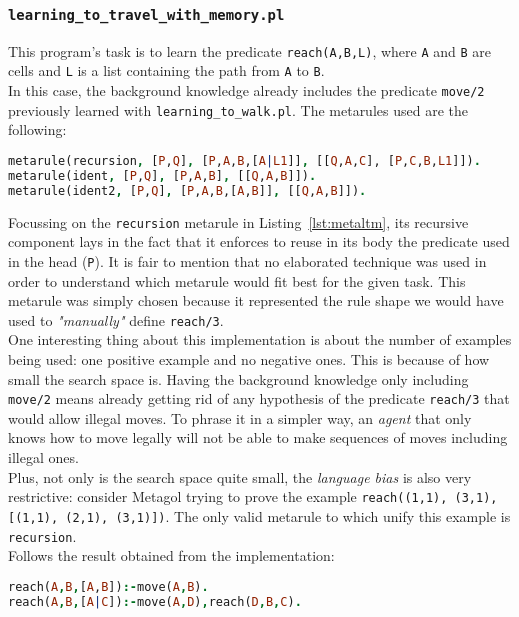 \subsubsection{\texttt{learning\_to\_travel\_with\_memory.pl}}\label{sec:lttm}
This program's task is to learn the predicate \texttt{reach(A,B,L)}, where \texttt{A} and \texttt{B} are cells and
\texttt{L} is a list containing the path from \texttt{A} to \texttt{B}.\\
In this case, the background knowledge already includes the predicate \texttt{move/2} previously learned with \texttt{learning\_to\_walk.pl}.
The metarules used are the following:
\begin{lstlisting}[label={lst:metaltm}, language=Prolog, caption=Metarules in \texttt{learning\_to\_travel\_with\_memory.pl}, belowcaptionskip=1cm]
metarule(recursion, [P,Q], [P,A,B,[A|L1]], [[Q,A,C], [P,C,B,L1]]).
metarule(ident, [P,Q], [P,A,B], [[Q,A,B]]).
metarule(ident2, [P,Q], [P,A,B,[A,B]], [[Q,A,B]]).
\end{lstlisting}
Focussing on the \texttt{recursion} metarule in Listing~\ref{lst:metaltm}, its recursive component lays in the fact that it enforces to reuse in its body the predicate used
in the head (\texttt{P}). It is fair to mention that no elaborated technique was used in order to understand which metarule would fit best for the given task. This metarule
was simply chosen because it represented the rule shape we would have used to \emph{"manually"} define \texttt{reach/3}.\\

One interesting thing about this implementation is about the number of examples being used: one positive example and no negative ones. This is because of how small
the search space is. Having the background knowledge only including \texttt{move/2} means already getting rid of any hypothesis of the predicate \texttt{reach/3} that
would allow illegal moves. To phrase it in a simpler way, an \emph{agent} that only knows how to move legally will not be able to make sequences of moves including
illegal ones.\\
Plus, not only is the search space quite small, the \emph{language bias} is also very restrictive: consider Metagol trying to prove the example \texttt{reach((1,1), (3,1), [(1,1), (2,1), (3,1)])}.
The only valid metarule to which unify this example is \texttt{recursion}.\\
Follows the result obtained from the implementation:
\begin{lstlisting}[language=Prolog, caption=Result of \texttt{learning\_to\_travel\_with\_memory.pl}, belowcaptionskip=1cm]
reach(A,B,[A,B]):-move(A,B).
reach(A,B,[A|C]):-move(A,D),reach(D,B,C).
\end{lstlisting}


